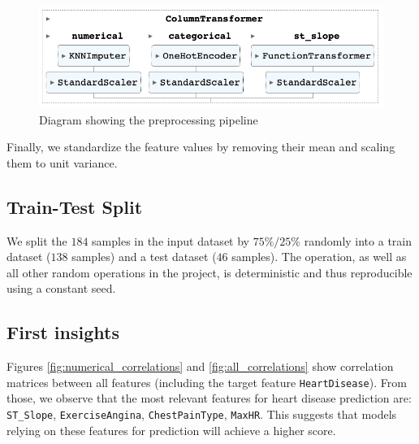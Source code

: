 \begin{figure}
    \centering
    \includegraphics[width=1\columnwidth]{images/preprocessor_pipeline.png}
    \caption{Diagram showing the preprocessing pipeline}
    \label{fig:preprocessing_pipeline}
\end{figure}

Finally, we standardize the feature values by removing their mean and scaling them to unit variance.

\subsection{Train-Test Split}

We split the $184$ samples in the input dataset by $75\%/25\%$ randomly into a train dataset ($138$ samples) and a test dataset ($46$ samples). The operation, as well as all other random operations in the project, is deterministic and thus reproducible using a constant seed.

\subsection{First insights}

Figures \ref{fig:numerical_correlations} and \ref{fig:all_correlations} show correlation matrices between all features (including the target feature \texttt{HeartDisease}). From those, we observe that the most relevant features for heart disease prediction are: \texttt{ST\_Slope}, \texttt{ExerciseAngina}, \texttt{ChestPainType}, \texttt{MaxHR}. This suggests that models relying on these features for prediction will achieve a higher score.


